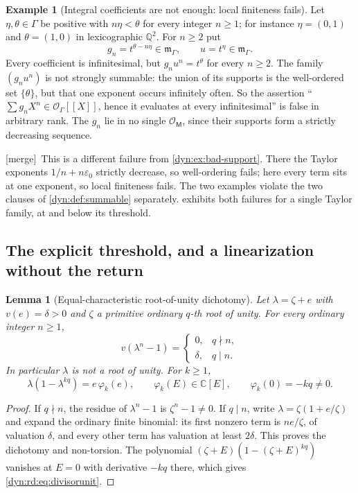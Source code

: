 \documentclass[11pt,letterpaper]{article}
\newtheorem{lemma}[lemma]{Lemma}
\theoremstyle{definition}
\newtheorem{example}[example]{Example}
\theoremstyle{remark}
\newcommand{\C}{\mathbb C}
\newcommand{\Q}{\mathbb Q}
\newcommand{\OO}{\mathcal O}
\newcommand{\m}{\mathfrak m}
\newcommand{\eps}{\varepsilon}
\newcommand{\mergetag}{\textup{\textsf{\small[merge]}}}%
\numberwithin{equation}{section}
\begin{document}
\begin{example}[Integral coefficients are not enough: local finiteness fails]
\label{dyn:rd:ex:collision}
Let $\eta,\theta\in\Gamma$ be positive with $n\eta<\theta$ for every
integer $n\ge1$; for instance $\eta=(0,1)$ and $\theta=(1,0)$ in
lexicographic $\Q^{2}$. For $n\ge2$ put
\[
 g_n=t^{\theta-n\eta}\in\m_\Gamma,\qquad u=t^{\eta}\in\m_\Gamma .
\]
Every coefficient is infinitesimal, but $g_nu^{n}=t^{\theta}$ for every
$n\ge2$. The family $(g_nu^{n})$ is not strongly summable: the union of its
supports is the well-ordered set $\{\theta\}$, but that one exponent occurs
infinitely often. So the assertion ``$\sum g_nX^{n}\in\OO_\Gamma[[X]]$,
hence it evaluates at every infinitesimal'' is false in arbitrary rank. The
$g_n$ lie in no single $\OO_{\mathsf M}$, since their supports form a
strictly decreasing sequence.

\mergetag\ This is a different failure from \cref{dyn:ex:bad-support}.
There the Taylor exponents $1/n+n\eps_0$ strictly decrease, so
well-ordering fails; here every term sits at one exponent, so local
finiteness fails. The two examples violate the two clauses of
\cref{dyn:def:summable} separately.  exhibits both
failures for a single Taylor family, at and below its threshold.
\end{example}

\subsection{The explicit threshold, and a linearization without the return}
\label{dyn:rd:subsec:threshold}

\begin{lemma}[Equal-characteristic root-of-unity dichotomy]
\label{dyn:rd:lem:divisors}
Let $\lambda=\zeta+e$ with $v(e)=\delta>0$ and $\zeta$ a primitive ordinary
$q$-th root of unity. For every ordinary integer $n\ge1$,
\[
 v(\lambda^{n}-1)=
 \begin{cases}
 0, & q\nmid n,\\
 \delta, & q\mid n .
 \end{cases}
\]
In particular $\lambda$ is not a root of unity. For $k\ge1$,
\begin{equation}\label{dyn:rd:eq:divisorunit}
 \lambda(1-\lambda^{kq})=e\,\varphi_k(e),\qquad
 \varphi_k(E)\in\C[E],\qquad \varphi_k(0)=-kq\ne0 .
\end{equation}
\end{lemma}
\begin{proof}
If $q\nmid n$, the residue of $\lambda^{n}-1$ is $\zeta^{n}-1\ne0$. If
$q\mid n$, write $\lambda=\zeta(1+e/\zeta)$ and expand the ordinary finite
binomial: its first nonzero term is $ne/\zeta$, of valuation $\delta$, and
every other term has valuation at least $2\delta$. This proves the dichotomy
and non-torsion. The polynomial $(\zeta+E)(1-(\zeta+E)^{kq})$ vanishes at
$E=0$ with derivative $-kq$ there, which gives
\eqref{dyn:rd:eq:divisorunit}.
\end{proof}
\end{document}
